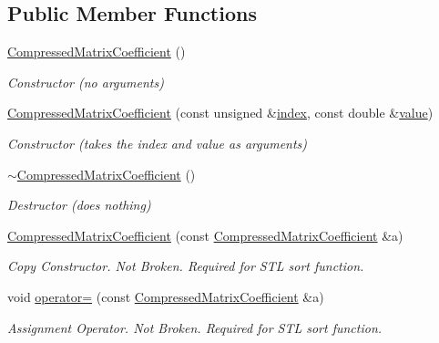 \subsection*{Public Member Functions}
\begin{DoxyCompactItemize}
\item 
\hyperlink{classoomph_1_1CompressedMatrixCoefficient_a7cbfc9de624baabd04b3501d9970bfb2}{Compressed\+Matrix\+Coefficient} ()
\begin{DoxyCompactList}\small\item\em Constructor (no arguments) \end{DoxyCompactList}\item 
\hyperlink{classoomph_1_1CompressedMatrixCoefficient_a80eba1cc000e17b7de0a24dbae74cb13}{Compressed\+Matrix\+Coefficient} (const unsigned \&\hyperlink{classoomph_1_1CompressedMatrixCoefficient_a680fdf9009100911ec5c43b53a0dccee}{index}, const double \&\hyperlink{classoomph_1_1CompressedMatrixCoefficient_ad37c133b527ae8ad5aa841ba3d3a29b3}{value})
\begin{DoxyCompactList}\small\item\em Constructor (takes the index and value as arguments) \end{DoxyCompactList}\item 
\hyperlink{classoomph_1_1CompressedMatrixCoefficient_a1d77f4d596e5263c1fe235dae6a9081c}{$\sim$\+Compressed\+Matrix\+Coefficient} ()
\begin{DoxyCompactList}\small\item\em Destructor (does nothing) \end{DoxyCompactList}\item 
\hyperlink{classoomph_1_1CompressedMatrixCoefficient_aa45c925ae1a3a0620475b60f64b6cf68}{Compressed\+Matrix\+Coefficient} (const \hyperlink{classoomph_1_1CompressedMatrixCoefficient}{Compressed\+Matrix\+Coefficient} \&a)
\begin{DoxyCompactList}\small\item\em Copy Constructor. Not Broken. Required for S\+TL sort function. \end{DoxyCompactList}\item 
void \hyperlink{classoomph_1_1CompressedMatrixCoefficient_ab58ad8da0c00b3c61acc13f68e865af3}{operator=} (const \hyperlink{classoomph_1_1CompressedMatrixCoefficient}{Compressed\+Matrix\+Coefficient} \&a)
\begin{DoxyCompactList}\small\item\em Assignment Operator. Not Broken. Required for S\+TL sort function. \end{DoxyCompactList}\item 

\end{DoxyCompactItemize}
